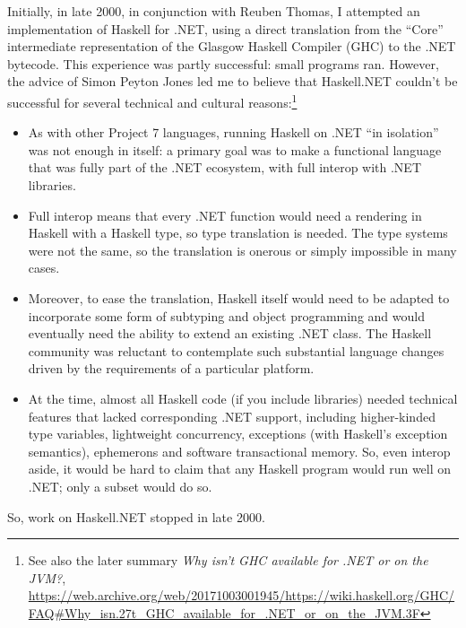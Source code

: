 \documentclass[acmsmall]{acmart}\settopmatter{}
\begin{document}
Initially, in late 2000, in conjunction with Reuben Thomas, I attempted an implementation of Haskell for .NET, using a direct translation from the “Core” intermediate
representation of the Glasgow Haskell Compiler (GHC) to the .NET bytecode. This experience was partly successful: small programs ran. However, the advice of Simon
Peyton Jones led me to believe that Haskell.NET couldn’t be successful for several technical and cultural reasons:\footnote{See also the later
summary \textit{Why isn't GHC available for .NET or on the JVM?}, \url{https://web.archive.org/web/20171003001945/https://wiki.haskell.org/GHC/FAQ#Why_isn.27t_GHC_available_for_.NET_or_on_the_JVM.3F}} 

\begin{itemize}
\item As with other Project 7 languages, running Haskell on .NET “in isolation” was not enough in itself: a primary goal was to make a functional language that
was fully part of the .NET ecosystem, with full interop with .NET libraries. 
\item Full interop means that every .NET function would need a rendering in Haskell with a Haskell type, so type translation is needed. The type systems
were not the same, so the translation is onerous or simply impossible in many cases.  
\item Moreover, to ease the translation, Haskell itself would need to be adapted to incorporate some form of subtyping and object programming and would
eventually need the ability to extend an existing .NET class.   The Haskell community was reluctant to contemplate such substantial language changes driven
by the requirements of a particular platform. 
\item At the time, almost all Haskell code (if you include libraries) needed technical features that lacked corresponding .NET support, including higher-kinded
type variables, lightweight concurrency, exceptions (with Haskell’s exception semantics), ephemerons and software transactional memory. So, even interop
aside, it would be hard to claim that any Haskell program would run well on .NET; only a subset would do so.   
\end{itemize}
So, work on Haskell.NET stopped in late 2000.
\end{document}

